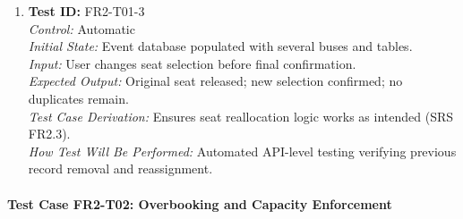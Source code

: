 \documentclass[12pt, titlepage]{article}
\begin{document}
\begin{enumerate}
    \item \textbf{Test ID:} FR2-T01-3\\[0.5em]
    \textit{Control:} Automatic\\[0.3em]
    \textit{Initial State:} Event database populated with several buses and tables.\\[0.3em]
    \textit{Input:} User changes seat selection before final confirmation.\\[0.3em]
    \textit{Expected Output:} Original seat released; new selection confirmed; no duplicates remain.\\[0.3em]
    \textit{Test Case Derivation:} Ensures seat reallocation logic works as intended (SRS FR2.3).\\[0.3em]
    \textit{How Test Will Be Performed:} Automated API-level testing verifying previous record removal and reassignment.
\end{enumerate}

\paragraph{Test Case FR2-T02: Overbooking and Capacity Enforcement}
\end{document}
